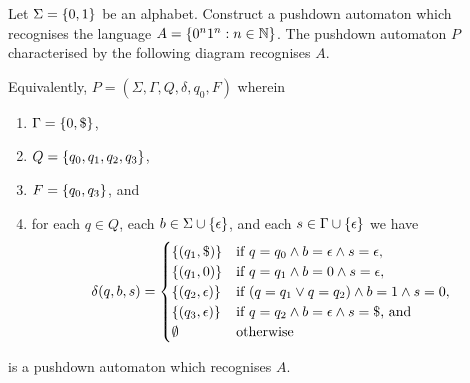 \Bxr
    Let \(\Sigma = \{0, 1\}\) be an alphabet. Construct a pushdown automaton
    which recognises the language \(A = \{0^n 1^n : n \in \mathbb{N}\}\).
\Exr
\Bsl
    The pushdown automaton \(P\) characterised by the following diagram
    recognises \(A\).
    \begin{figure}[!h]
        \centering
    \end{figure}

    \noindent Equivalently, \(P = (\Sigma, \Gamma, Q, \delta, q_0, F)\)
    wherein
    \begin{enumerate}
        \item \(\Gamma = \{0, \$\}\),
        \item \(Q = \{q_0, q_1, q_2, q_3\}\),
        \item \(F = \{q_0, q_3\}\), and
        \item for each \(q \in Q\), each \(b \in \Sigma \cup
            \{\epsilon\}\), and each \(s \in \Gamma \cup
            \{\epsilon\}\) we have
            \[
                \delta(q, b, s) = \begin{cases}
                    \{(q_1, \$)\} & \text{if } q = q_0 \land b = \epsilon
                    \land s = \epsilon,\\
                    \{(q_1, 0)\} & \text{if } q = q_1 \land b = 0 \land s =
                    \epsilon,\\
                    \{(q_2, \epsilon)\} & \text{if } (q = q_1 \lor q = q_2)
                    \land b = 1 \land s = 0,\\
                    \{(q_3, \epsilon)\} & \text{if } q = q_2 \land b =
                    \epsilon \land s = \$ \text{, and}\\
                    \emptyset & \text{otherwise}
                \end{cases}
            \]
    \end{enumerate}
    is a pushdown automaton which recognises \(A\).
\Esl

